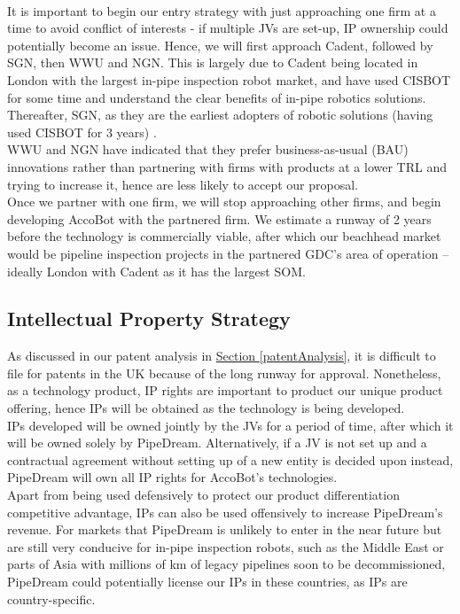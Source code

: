 \documentclass[11pt]{article}		%
\newcommand{\sectref}[1]{\hyperref[#1]{Section \ref*{#1}}}     %
\begin{document}
    \\ \hspace*{3ex}It is important to begin our entry strategy with just approaching one firm at a time to avoid conflict of interests - if multiple JVs are set-up, IP ownership could potentially become an issue. Hence, we will first approach Cadent, followed by SGN, then WWU and NGN. This is largely due to Cadent being located in London with the largest in-pipe inspection robot market, and have used CISBOT for some time and understand the clear benefits of in-pipe robotics solutions. Thereafter, SGN, as they are the earliest adopters of robotic solutions (having used CISBOT for 3 years) .
    \\ \hspace*{3ex}WWU and NGN have indicated that they prefer business-as-usual (BAU) innovations rather than partnering with firms with products at a lower TRL and trying to increase it, hence are less likely to accept our proposal. 
    \\ \hspace*{3ex}Once we partner with one firm, we will stop approaching other firms, and begin developing AccoBot with the partnered firm. We estimate a runway of 2 years  before the technology is commercially viable, after which our beachhead market would be pipeline inspection projects in the partnered GDC’s area of operation – ideally London with Cadent as it has the largest SOM. 

	\subsection{Intellectual Property Strategy}
	As discussed in our patent analysis in \sectref{patentAnalysis}, it is difficult to file for patents in the UK because of the long runway for approval. Nonetheless, as a technology product, IP rights are important to product our unique product offering, hence IPs will be obtained as the technology is being developed.
    \\ \hspace*{3ex}IPs developed will be owned jointly by the JVs for a period of time, after which it will be owned solely by PipeDream. Alternatively, if a JV is not set up and a contractual agreement without setting up of a new entity is decided upon instead, PipeDream will own all IP rights for AccoBot’s technologies. 
    \\ \hspace*{3ex}Apart from being used defensively to protect our product differentiation competitive advantage, IPs can also be used offensively to increase PipeDream’s revenue. For markets that PipeDream is unlikely to enter in the near future but are still very conducive for in-pipe inspection robots, such as the Middle East or parts of Asia with millions of km of legacy pipelines soon to be decommissioned, PipeDream could potentially license our IPs in these countries, as IPs are country-specific. 
\end{document}

